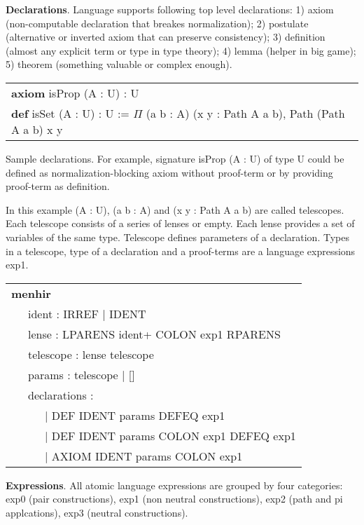 \documentclass{article}
\theoremstyle{definition}
\newcommand{\tabstyle}[0]{\scriptsize\ttfamily\fontseries{l}\selectfont}
\begin{document}
\textbf{Declarations}. Language supports following top level declarations:
1) axiom (non-computable declaration that breakes normalization);
2) postulate (alternative or inverted axiom that can preserve consistency);
3) definition (almost any explicit term or type in type theory);
4) lemma (helper in big game);
5) theorem (something valuable or complex enough).

\begin{table}[ht!]
\tabstyle
\begin{tabular}{l}
\textbf{axiom} isProp (A : U) : U \\
\textbf{def} isSet (A : U) : U := \textbf{$\Pi$} (a b : A) (x y : Path A a b), Path (Path A a b) x y
\end{tabular}
\end{table}

Sample declarations. For example, signature isProp (A : U) of type U could be
defined as normalization-blocking axiom without proof-term or by providing proof-term as definition.

In this example (A : U), (a b : A) and (x y : Path A a b) are called telescopes.
Each telescope consists of a series of lenses or empty. Each lense provides a
set of variables of the same type. Telescope defines parameters of a declaration.
Types in a telescope, type of a declaration and a proof-terms are a language expressions exp1.

\begin{table}[ht]
\tabstyle
\begin{tabular}{l}
\textbf{menhir} \\
\ \ \ ident : IRREF | IDENT \\
\ \ \ lense : LPARENS ident+ COLON exp1 RPARENS \\
\ \ \ telescope : lense telescope \\
\ \ \ params : telescope | [] \\
\ \ \ declarations : \\
\ \ \ \ \ \ | DEF IDENT params DEFEQ exp1 \\
\ \ \ \ \ \ | DEF IDENT params COLON exp1 DEFEQ exp1 \\
\ \ \ \ \ \ | AXIOM IDENT params COLON exp1
\end{tabular}
\end{table}

\textbf{Expressions}. All atomic language expressions are grouped by four categories:
exp0 (pair constructions), exp1 (non neutral constructions), exp2 (path and pi applcations),
exp3 (neutral constructions).
\end{document}

